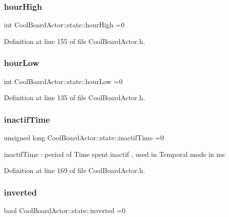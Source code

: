 \subsubsection{\texorpdfstring{hour\+High}{hourHigh}}
{\footnotesize\ttfamily int Cool\+Board\+Actor\+::state\+::hour\+High =0}



Definition at line 155 of file Cool\+Board\+Actor.\+h.

\mbox{\label{struct_cool_board_actor_1_1state_ae7034bf95b36f1392f9de076fa0c8c0f}} 
\subsubsection{\texorpdfstring{hour\+Low}{hourLow}}
{\footnotesize\ttfamily int Cool\+Board\+Actor\+::state\+::hour\+Low =0}



Definition at line 135 of file Cool\+Board\+Actor.\+h.

\mbox{\label{struct_cool_board_actor_1_1state_a6d88835f4402b3b81cd404784281854b}} 
\subsubsection{\texorpdfstring{inactif\+Time}{inactifTime}}
{\footnotesize\ttfamily unsigned long Cool\+Board\+Actor\+::state\+::inactif\+Time =0}

inactif\+Time \+: period of Time spent inactif , used in Temporal mode in ms 

Definition at line 169 of file Cool\+Board\+Actor.\+h.

\mbox{\label{struct_cool_board_actor_1_1state_aa4fdca81973fd7b29541877db1cf27bd}} 
\subsubsection{\texorpdfstring{inverted}{inverted}}
{\footnotesize\ttfamily bool Cool\+Board\+Actor\+::state\+::inverted =0}

